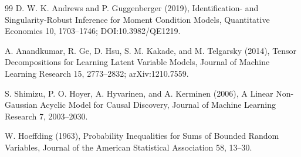 \documentclass{article}
\begin{document}
\begin{thebibliography}{99}
   D. W. K. Andrews and P. Guggenberger (2019), Identification- and Singularity-Robust Inference for Moment Condition Models, Quantitative Economics 10, 1703--1746; DOI:10.3982/QE1219.

   A. Anandkumar, R. Ge, D. Hsu, S. M. Kakade, and M. Telgarsky (2014), Tensor Decompositions for Learning Latent Variable Models, Journal of Machine Learning Research 15, 2773--2832; arXiv:1210.7559.

   S. Shimizu, P. O. Hoyer, A. Hyvarinen, and A. Kerminen (2006), A Linear Non-Gaussian Acyclic Model for Causal Discovery, Journal of Machine Learning Research 7, 2003--2030.

   W. Hoeffding (1963), Probability Inequalities for Sums of Bounded Random Variables, Journal of the American Statistical Association 58, 13--30.

\end{thebibliography}
\end{document}
